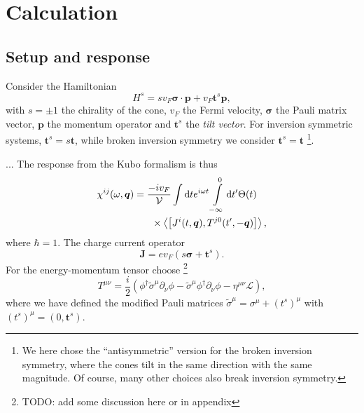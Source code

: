 \documentclass[%
 reprint,
 amsmath,amssymb,
 aps,
]{revtex4-2}
\renewcommand\vec\bm  %
\begin{document}
\section{Calculation\label{sec:calculation}}
\subsection{Setup and response}
Consider the Hamiltonian
\begin{equation}
  \label{eq:hamiltonian}
  H^s = s v_F \vec{\sigma} \cdot \vec{p} + v_F \vec{t}^s \vec{p},
\end{equation}
with \( s = \pm 1 \) the chirality of the cone, \( v_F \) the Fermi velocity, \( \vec{\sigma} \) the Pauli matrix vector, \( \vec{p} \) the momentum operator and \( \vec{t}^s \) the \emph{tilt vector}.
For inversion symmetric systems, \( \vec{t}^s = s \vec{t} \), while broken inversion symmetry we consider \( \vec{t}^s = \vec{t} \)
\footnote{We here chose the ``antisymmetric'' version for the broken inversion symmetry, where the cones tilt in the same direction with the same magnitude.
Of course, many other choices also break inversion symmetry.}.

...
The response from the Kubo formalism is thus
\begin{equation}
  \label{eq:kubo-response}
  \begin{multlined}
    \chi^{ij}(\omega, \vec{q}) = \frac{-i v_F}{\mathcal{V}}
    \int \mathrm{d} t
    e^{i \omega t}
    \int\limits_{-\infty}^0 \mathrm{d} t'
    \Theta(t)\\
    \times
    \Braket{\left[J^i(t, \vec{q}), T^{j0}(t', -\vec{q})\right]},
  \end{multlined}
\end{equation}
where \( \hbar = 1 \).
The charge current operator
\begin{equation}
  \label{eq:current-op}
  \vec{J} = e v_F (s \vec{\sigma} + \vec{t}^s).
\end{equation}
For the energy-momentum tensor choose
\footnote{TODO: add some discussion here or in appendix}
\begin{equation}
  \label{eq:energy-momentum-tensor}
  T^{\mu\nu} =
  \frac{i}{2} (
  \phi^{\dagger} \tilde{\sigma}^{\mu} \partial_{\nu} \phi
  -\tilde{\sigma} ^{\mu} \phi^{\dagger} \partial_{\nu} \phi
  -\eta^{\mu \nu} \mathcal{L}
  ),
\end{equation}
where we have defined the modified Pauli matrices \( \tilde{\sigma} ^{\mu} = \sigma^{\mu} + (t^s)^{\mu} \) with \( (t^s)^{\mu} = (0, \vec{t}^s) \).
\end{document}
